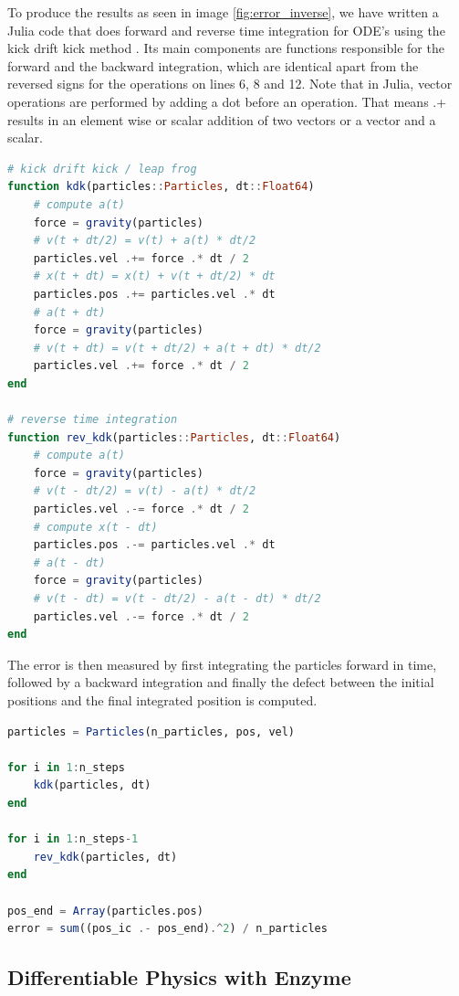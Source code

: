 \documentclass{article}
\begin{document}
{\begin{appendices}
To produce the results as seen in image \ref{fig:error_inverse}, we have written a Julia code that does forward and reverse time integration for ODE's using the kick drift kick method \cite{hut1995building}. Its main components are functions responsible for the forward and the backward integration, which are identical apart from the reversed signs for the operations on lines 6, 8 and 12. Note that in Julia, vector operations are performed by adding a dot before an operation. That means {.+} results in an element wise or scalar addition of two vectors or a vector and a scalar.

\begin{lstlisting}[language=Julia]
# kick drift kick / leap frog
function kdk(particles::Particles, dt::Float64)
    # compute a(t)
    force = gravity(particles)
    # v(t + dt/2) = v(t) + a(t) * dt/2
    particles.vel .+= force .* dt / 2
    # x(t + dt) = x(t) + v(t + dt/2) * dt
    particles.pos .+= particles.vel .* dt
    # a(t + dt)
    force = gravity(particles)
    # v(t + dt) = v(t + dt/2) + a(t + dt) * dt/2
    particles.vel .+= force .* dt / 2
end

# reverse time integration
function rev_kdk(particles::Particles, dt::Float64)
    # compute a(t)
    force = gravity(particles)
    # v(t - dt/2) = v(t) - a(t) * dt/2
    particles.vel .-= force .* dt / 2
    # compute x(t - dt)
    particles.pos .-= particles.vel .* dt
    # a(t - dt)
    force = gravity(particles)
    # v(t - dt) = v(t - dt/2) - a(t - dt) * dt/2
    particles.vel .-= force .* dt / 2
end
\end{lstlisting}

The error is then measured by first integrating the particles forward in time, followed by a backward integration and finally the defect between the initial positions and the final integrated position is computed.

\begin{lstlisting}[language=Julia]
particles = Particles(n_particles, pos, vel)

for i in 1:n_steps
    kdk(particles, dt)
end

for i in 1:n_steps-1
    rev_kdk(particles, dt)
end

pos_end = Array(particles.pos)
error = sum((pos_ic .- pos_end).^2) / n_particles
\end{lstlisting}


\subsection{Differentiable Physics with Enzyme}
\label{diff-julia}


\end{appendices}}
\end{document}

